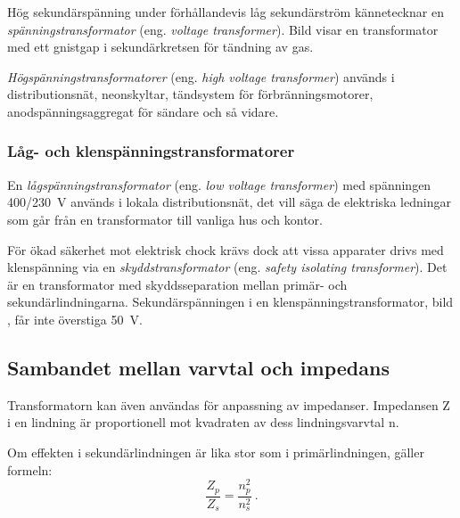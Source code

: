Hög sekundärspänning under förhållandevis låg sekundärström kännetecknar en
\emph{spänningstransformator} (eng. \emph{voltage transformer}).
Bild  visar en transformator med ett gnistgap i
sekundärkretsen för tändning av gas.

\emph{Högspänningstransformatorer} (eng. \emph{high voltage transformer})
används i distributionsnät, neonskyltar, tändsystem för förbränningsmotorer,
anodspänningsaggregat för sändare och så vidare.


\subsubsection{Låg- och klenspänningstransformatorer}


En \emph{lågspänningstransformator} (eng. \emph{low voltage transformer}) med
spänningen 400/\SI{230}{\volt} används i lokala distributionsnät, det vill säga
de elektriska ledningar som går från en transformator till vanliga hus och
kontor.

För ökad säkerhet mot elektrisk chock krävs dock att vissa apparater drivs med
klenspänning via en \emph{skyddstransformator}
(eng. \emph{safety isolating transformer}).
Det är en transformator med skyddsseparation mellan primär- och
sekundärlindningarna.
Sekundärspänningen i en klenspänningstransformator, bild ,
får inte överstiga \SI{50}{\volt}.

\subsection{Sambandet mellan varvtal och impedans}


Transformatorn kan även användas för anpassning av impedanser.
Impedansen Z i en lindning är proportionell mot kvadraten av dess
lindningsvarvtal n.

Om effekten i sekundärlindningen är lika stor som i primärlindningen, gäller
formeln:
%
\[\dfrac{Z_p}{Z_s} = \dfrac{n_p^2}{n_s^2}~.\]
